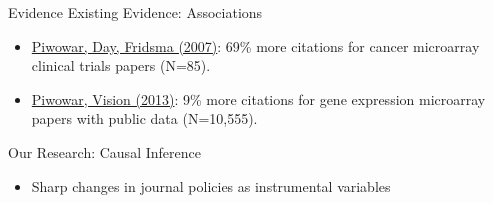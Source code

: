 \documentclass{beamer}
\begin{document}
\begin{frame}{Evidence}
Existing Evidence: Associations
\begin{itemize}
\item \href{http://journals.plos.org/plosone/article?id=10.1371/journal.pone.0000308}{Piwowar, Day, Fridsma (2007)}: 69\% more citations for cancer microarray clinical trials papers (N=85).
\item \href{https://peerj.com/articles/175/}{Piwowar, Vision (2013)}: 9\% more citations for gene expression microarray papers with public data (N=10,555).
%
\end{itemize}

Our Research: Causal Inference
\begin{itemize}
\item Sharp changes in journal policies as instrumental variables
\end{itemize}
\end{frame}

%
\end{document}
